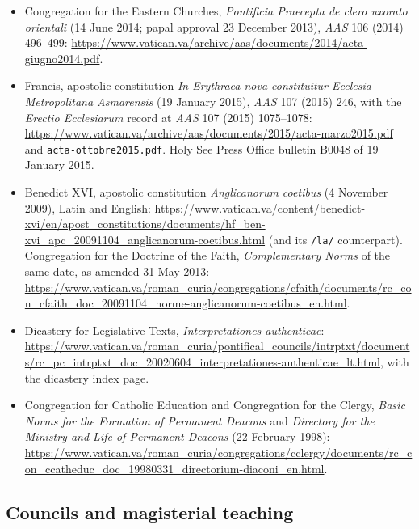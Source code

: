 \begin{itemize}
\item Congregation for the Eastern Churches, \emph{Pontificia Praecepta de clero uxorato orientali} (14 June 2014; papal approval 23 December 2013), \emph{AAS} 106 (2014) 496--499: \url{https://www.vatican.va/archive/aas/documents/2014/acta-giugno2014.pdf}.
\item Francis, apostolic constitution \emph{In Erythraea nova constituitur Ecclesia Metropolitana Asmarensis} (19 January 2015), \emph{AAS} 107 (2015) 246, with the \emph{Erectio Ecclesiarum} record at \emph{AAS} 107 (2015) 1075--1078: \url{https://www.vatican.va/archive/aas/documents/2015/acta-marzo2015.pdf} and \texttt{acta-ottobre2015.pdf}. Holy See Press Office bulletin B0048 of 19 January 2015.
\item Benedict XVI, apostolic constitution \emph{Anglicanorum coetibus} (4 November 2009), Latin and English: \url{https://www.vatican.va/content/benedict-xvi/en/apost_constitutions/documents/hf_ben-xvi_apc_20091104_anglicanorum-coetibus.html} (and its \texttt{/la/} counterpart). Congregation for the Doctrine of the Faith, \emph{Complementary Norms} of the same date, as amended 31 May 2013: \url{https://www.vatican.va/roman_curia/congregations/cfaith/documents/rc_con_cfaith_doc_20091104_norme-anglicanorum-coetibus_en.html}.
\item Dicastery for Legislative Texts, \emph{Interpretationes authenticae}: \url{https://www.vatican.va/roman_curia/pontifical_councils/intrptxt/documents/rc_pc_intrptxt_doc_20020604_interpretationes-authenticae_lt.html}, with the dicastery index page.
\item Congregation for Catholic Education and Congregation for the Clergy, \emph{Basic Norms for the Formation of Permanent Deacons} and \emph{Directory for the Ministry and Life of Permanent Deacons} (22 February 1998): \url{https://www.vatican.va/roman_curia/congregations/cclergy/documents/rc_con_ccatheduc_doc_19980331_directorium-diaconi_en.html}.
\end{itemize}

\subsection*{Councils and magisterial teaching}

